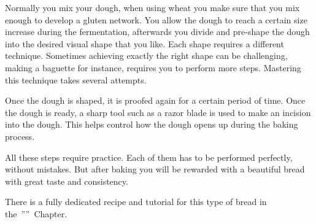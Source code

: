 Normally you mix your dough, when using wheat you make sure that you mix
enough to develop a gluten network.  You allow the dough to reach a certain
size increase during the fermentation, afterwards you divide and pre-shape the
dough into the desired visual shape that you like.  Each shape requires a
different technique. Sometimes achieving exactly the right shape can be
challenging, making a baguette for instance, requires you to perform more
steps. Mastering this technique takes several attempts.

Once the dough is shaped, it is proofed again for a certain
period of time. Once the dough is ready, a sharp tool such
as a razor blade is used to make an incision into the dough.
This helps control how the dough opens up during the baking process.

All these steps require practice. Each of them has to be
performed perfectly, without mistakes.
But after baking you will be rewarded with a beautiful bread
with great taste and consistency.

There is a fully dedicated recipe and tutorial
for this type of bread in the~''''~Chapter.
